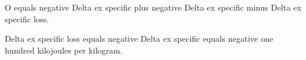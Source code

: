 O equals negative Delta ex specific plus negative Delta ex specific minus Delta ex specific loss.  

Delta ex specific loss equals negative Delta ex specific equals negative one hundred kilojoules per kilogram.